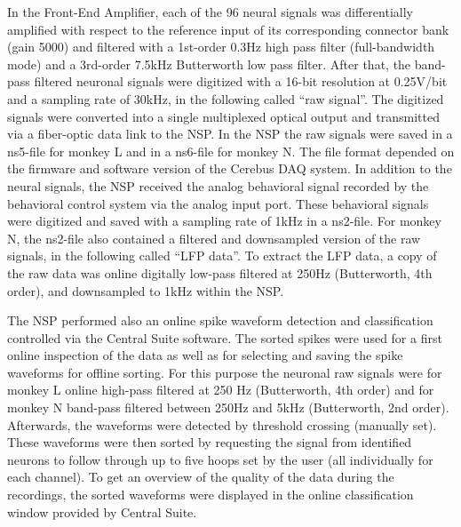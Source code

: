 {In the Front-End Amplifier, each of the 96 neural signals was differentially amplified with respect to the reference input of its corresponding connector bank (gain 5000) and filtered with a 1st-order 0.3Hz high pass filter (full-bandwidth mode) and a 3rd-order 7.5kHz Butterworth low pass filter. After that, the band-pass filtered neuronal signals were digitized with a 16-bit resolution at 0.25V/bit and a sampling rate of 30kHz, in the following called “raw signal”. The digitized signals were converted into a single multiplexed optical output and transmitted via a fiber-optic data link to the NSP. In the NSP the raw signals were saved in a ns5-file for monkey L and in a ns6-file for monkey N. The file format depended on the firmware and software version of the Cerebus DAQ system. In addition to the neural signals, the NSP received the analog behavioral signal recorded by the behavioral control system via the analog input port. These behavioral signals were digitized and saved with a sampling rate of 1kHz in a ns2-file. For monkey N, the ns2-file also contained a filtered and downsampled version of the raw signals, in the following called “LFP data”. To extract the LFP data, a copy of the raw data was online digitally low-pass filtered at 250Hz (Butterworth, 4th order), and downsampled to 1kHz within the NSP.

The NSP performed also an online spike waveform detection and classification controlled via the Central Suite software. The sorted spikes were used for a first online inspection of the data as well as for selecting and saving the spike waveforms for offline sorting. For this purpose the neuronal raw signals were for monkey L online high-pass filtered at 250 Hz (Butterworth, 4th order) and for monkey N band-pass filtered between 250Hz and 5kHz (Butterworth, 2nd order). Afterwards, the waveforms were detected by threshold crossing (manually set). These waveforms were then sorted by requesting the signal from identified neurons to follow through up to five hoops set by the user (all individually for each channel). To get an overview of the quality of the data during the recordings, the sorted waveforms were displayed in the online classification window provided by Central Suite.

}
